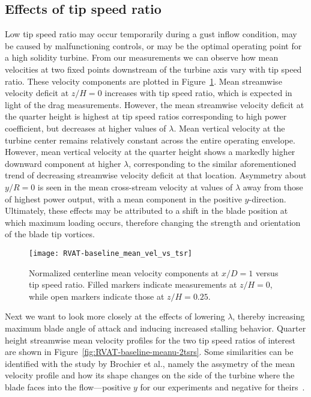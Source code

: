 \subsection{Effects of tip speed ratio}

Low tip speed ratio may occur temporarily during a gust inflow condition, may be
caused by malfunctioning controls, or may be the optimal operating point for a
high solidity turbine. From our measurements we can observe how mean velocities
at two fixed points downstream of the turbine axis vary with tip speed ratio.
These velocity components are plotted in
Figure~\ref{fig:RVAT-baseline-mean-vel-vs-tsr}. Mean streamwise velocity deficit
at $z/H = 0$ increases with tip speed ratio, which is expected in light of the
drag measurements. However, the mean streamwise velocity deficit at the quarter
height is highest at tip speed ratios corresponding to high power coefficient,
but decreases at higher values of $\lambda$. Mean vertical velocity at the
turbine center remains relatively constant across the entire operating envelope.
However, mean vertical velocity at the quarter height shows a markedly higher
downward component at higher $\lambda$, corresponding to the similar
aforementioned trend of decreasing streamwise velocity deficit at that location.
Asymmetry about $y/R=0$ is seen in the mean cross-stream velocity at values of
$\lambda$ away from those of highest power output, with a mean component in the
positive $y$-direction. Ultimately, these effects may be attributed to a shift
in the blade position at which maximum loading occurs, therefore changing the
strength and orientation of the blade tip vortices.

\begin{figure}
    \centering

    \texttt{[image: RVAT-baseline\_mean\_vel\_vs\_tsr]}

    \caption{Normalized centerline mean velocity components at $x/D=1$ versus
        tip speed ratio. Filled markers indicate measurements at $z/H=0$, while open
        markers indicate those at $z/H=0.25$.}

    \label{fig:RVAT-baseline-mean-vel-vs-tsr}
\end{figure}

Next we want to look more closely at the effects of lowering $\lambda$, thereby
increasing maximum blade angle of attack and inducing increased stalling
behavior. Quarter height streamwise mean velocity profiles for the two tip speed
ratios of interest are shown in Figure~\ref{fig:RVAT-baseline-meanu-2tsrs}. Some
similarities can be identified with the study by Brochier et al., namely the
assymetry of the mean velocity profile and how its shape changes on the side of
the turbine where the blade faces into the flow---positive $y$ for our
experiments and negative for theirs~\cite{Brochier1986}.

